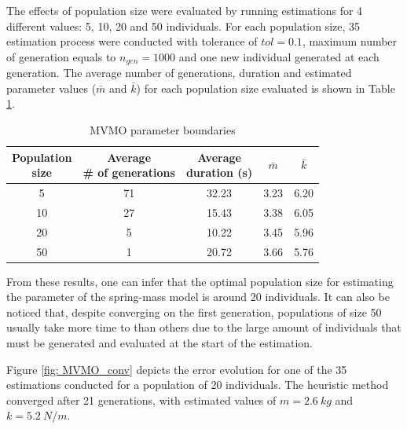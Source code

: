 The effects of population size were evaluated by running estimations for 4 different values: 5, 10, 20 and 50 individuals. For each population size, 35 estimation process were conducted with tolerance of $tol = 0.1$, maximum number of generation equals to $n_{gen}=1000$ and one new individual generated at each generation. The average number of generations, duration and estimated parameter values ($\bar{m}$ and $\bar{k}$) for each population size evaluated is shown in Table \ref{tab: spring_mass_MVMO_size}.

\begin{table}[!h]
	\centering
	\caption{MVMO parameter boundaries}
	\begin{tabular}{c|cccc}
		\shortstack{Population \\ size} & \shortstack{Average \\ \# of generations} & \shortstack{Average \\ duration (s)} & $\bar{m}$ & $\bar{k}$ \\
		\hline
		5 & 71 & 32.23 & 3.23 & 6.20 \\
		10 & 27 & 15.43 & 3.38 & 6.05 \\
		20 & 5 & 10.22 & 3.45 & 5.96 \\
		50 & 1 & 20.72 & 3.66 & 5.76 \\
	\end{tabular}
	\label{tab: spring_mass_MVMO_size}
\end{table}

From these results, one can infer that the optimal population size for estimating the parameter of the spring-mass model is around 20 individuals. It can also be noticed that, despite converging on the first generation, populations of size 50 usually take more time to than others due to the large amount of individuals that must be generated and evaluated at the start of the estimation.

Figure \ref{fig: MVMO_conv} depicts the error evolution for one of the 35 estimations conducted for a population of 20 individuals. The heuristic method converged after 21 generations, with estimated values of $m=2.6\ kg$ and $k=5.2\ N/m$.

